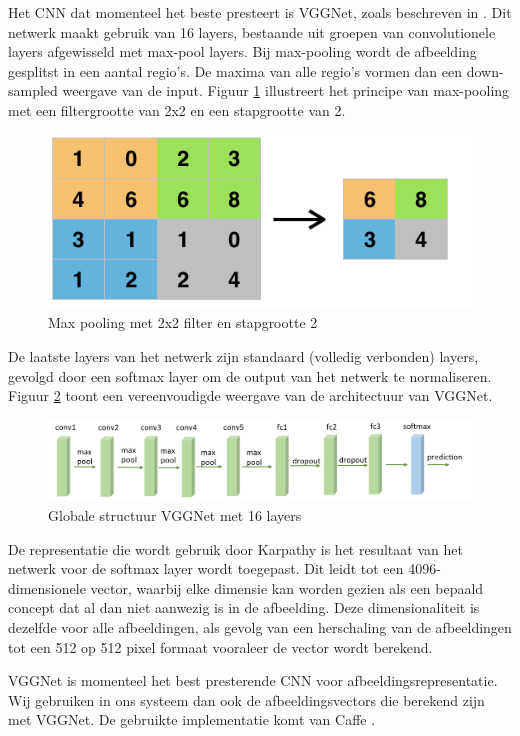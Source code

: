 Het CNN dat momenteel het beste presteert is VGGNet, zoals beschreven in . Dit netwerk maakt gebruik van 16 layers, bestaande uit groepen van convolutionele layers afgewisseld met max-pool layers. Bij max-pooling wordt de afbeelding gesplitst in een aantal regio's. De maxima van alle regio's vormen dan een down-sampled weergave van de input. Figuur \ref{fig:maxpool} illustreert het principe van max-pooling met een filtergrootte van 2x2 en een stapgrootte van 2.

\begin{figure}[tb]
    \centering
    \includegraphics[width=0.6\linewidth]{Images/maxpool.png}
    \caption{Max pooling met 2x2 filter en stapgrootte 2}
    \label{fig:maxpool}
\end{figure}

De laatste layers van het netwerk zijn standaard (volledig verbonden) layers, gevolgd door een softmax layer om de output van het netwerk te normaliseren. Figuur \ref{fig:vggnet} toont een vereenvoudigde weergave van de architectuur van VGGNet.

\begin{figure}[tb]
    \centering
    \includegraphics[width=\linewidth]{Images/vgg16.PNG}
    \caption{Globale structuur VGGNet met 16 layers}
    \label{fig:vggnet}
\end{figure}

De representatie die wordt gebruik door Karpathy is het resultaat van het netwerk voor de softmax layer wordt toegepast. Dit leidt tot een 4096-dimensionele vector, waarbij elke dimensie kan worden gezien als een bepaald concept dat al dan niet aanwezig is in de afbeelding. Deze dimensionaliteit is dezelfde voor alle afbeeldingen, als gevolg van een herschaling van de afbeeldingen tot een 512 op 512 pixel formaat vooraleer de vector wordt berekend.

VGGNet is momenteel het best presterende CNN voor afbeeldingsrepresentatie. Wij gebruiken in ons systeem dan ook de afbeeldingsvectors die berekend zijn met VGGNet. De gebruikte implementatie komt van Caffe .

